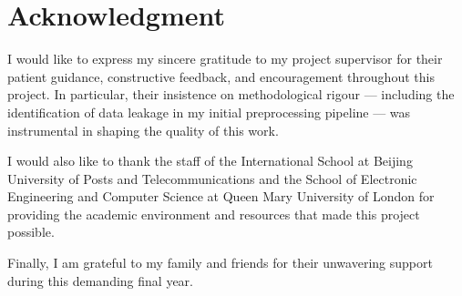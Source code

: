 \section*{Acknowledgment}
 {}
\vspace{-1em}
{\fontsize{12pt}{18pt}\selectfont

I would like to express my sincere gratitude to my project supervisor for their patient guidance, constructive feedback, and encouragement throughout this project. In particular, their insistence on methodological rigour --- including the identification of data leakage in my initial preprocessing pipeline --- was instrumental in shaping the quality of this work.

I would also like to thank the staff of the International School at Beijing University of Posts and Telecommunications and the School of Electronic Engineering and Computer Science at Queen Mary University of London for providing the academic environment and resources that made this project possible.

Finally, I am grateful to my family and friends for their unwavering support during this demanding final year.

}
